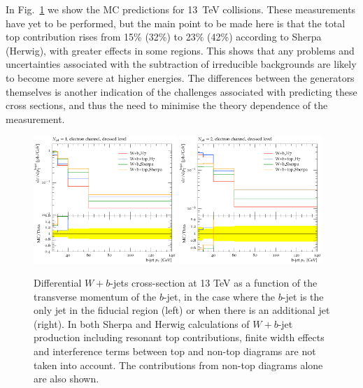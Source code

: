 \documentclass[11pt]{cernrep}
\begin{document}
In Fig.~\ref{fig:13tev} we show the MC predictions for 13~TeV collisions. These measurements have yet to be
performed, but the main point to be made here is that the total top contribution rises from 15\% (32\%)
to 23\% (42\%) according to Sherpa (Herwig), with greater effects in some regions.  This shows that any
problems and uncertainties associated with the subtraction of irreducible backgrounds are likely to become
more severe at higher energies. The differences between the generators themselves is another indication of the 
challenges associated with predicting these cross sections, and thus the need to minimise the theory
dependence of the measurement.
  
\begin{figure}
\centering
	\includegraphics[width=0.48\textwidth]{13tev-1jet.pdf}
	\includegraphics[width=0.48\textwidth]{13tev-2jet.pdf}
\caption{\label{fig:13tev}
  Differential $W+b$-jets cross-section at 13 TeV as a function of the
  transverse momentum of the $b$-jet, in the case where the $b$-jet is the only jet in the fiducial region
  (left) or when there is an additional jet (right). In both Sherpa and Herwig
  calculations of $W+b$-jet production including resonant top contributions, finite width effects 
  and interference terms between top and non-top diagrams are not
  taken into account. The contributions from non-top diagrams alone are also shown.}
\end{figure}
\end{document}

